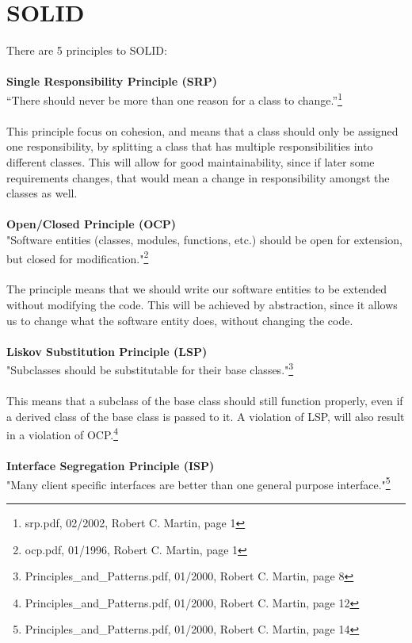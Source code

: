\section{SOLID}
\label{appendix:SOLID}
There are 5 principles to SOLID:
\\
\\
\textbf{Single Responsibility Principle (SRP)}
\\
 “There should never be more than one reason for a class to change.”\footnote{srp.pdf, 02/2002, Robert C. Martin, page 1}
\\
\\
This principle focus on cohesion, and means that a class should only be assigned one responsibility, by splitting a class that has multiple responsibilities into different classes. This will allow for good maintainability, since if later some requirements changes, that would mean a change in responsibility amongst the classes as well.
\\
\\
\textbf{Open/Closed Principle (OCP)}
\\
"Software entities (classes, modules, functions, etc.) should be open for extension, but closed for modification."\footnote{ocp.pdf, 01/1996, Robert C. Martin, page 1}
\\
\\
The principle means that we should write our software entities to be extended without modifying the code. This will be achieved by abstraction, since it allows us to change what the software entity does, without changing the code.
\\
\\
\textbf{Liskov Substitution Principle (LSP)}
\\
"Subclasses should be substitutable for their base classes."\footnote{Principles\_and\_Patterns.pdf, 01/2000, Robert C. Martin, page 8}
\\
\\
This means that a subclass of the base class should still function properly, even if a derived class of the base class is passed to it. A violation of LSP, will also result in a violation of OCP.\footnote{Principles\_and\_Patterns.pdf, 01/2000, Robert C. Martin, page 12}
\\
\\
\textbf{Interface Segregation Principle (ISP)}
\\
"Many client specific interfaces are better than one general purpose interface."\footnote{Principles\_and\_Patterns.pdf, 01/2000, Robert C. Martin, page 14}
